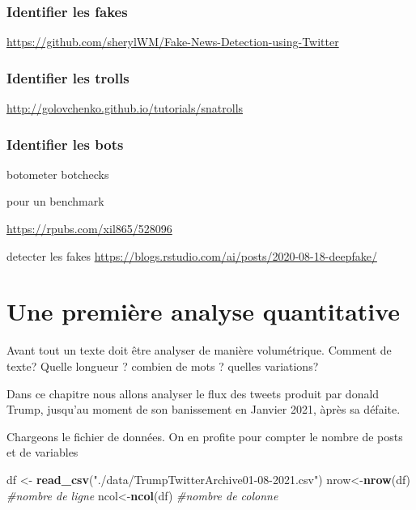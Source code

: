 \documentclass[
]{book}
\newenvironment{Shaded}{\begin{snugshade}}{\end{snugshade}}
\newcommand{\CommentTok}[1]{\textcolor[rgb]{0.56,0.35,0.01}{\textit{#1}}}
\newcommand{\KeywordTok}[1]{\textcolor[rgb]{0.13,0.29,0.53}{\textbf{#1}}}
\newcommand{\NormalTok}[1]{#1}
\newcommand{\StringTok}[1]{\textcolor[rgb]{0.31,0.60,0.02}{#1}}
\begin{document}
\hypertarget{identifier-les-fakes}{%
\subsection{Identifier les fakes}\label{identifier-les-fakes}}

\url{https://github.com/sherylWM/Fake-News-Detection-using-Twitter}

\hypertarget{identifier-les-trolls}{%
\subsection{Identifier les trolls}\label{identifier-les-trolls}}

\url{http://golovchenko.github.io/tutorials/snatrolls}

\hypertarget{identifier-les-bots}{%
\subsection{Identifier les bots}\label{identifier-les-bots}}

botometer
botchecks

pour un benchmark

\url{https://rpubs.com/xil865/528096}

detecter les fakes \url{https://blogs.rstudio.com/ai/posts/2020-08-18-deepfake/}

\hypertarget{une-premiuxe8re-analyse-quantitative}{%
\chapter{Une première analyse quantitative}\label{une-premiuxe8re-analyse-quantitative}}

Avant tout un texte doit être analyser de manière volumétrique. Comment de texte? Quelle longueur ? combien de mots ? quelles variations?

Dans ce chapitre nous allons analyser le flux des tweets produit par donald Trump, jusqu'au moment de son banissement en Janvier 2021, àprès sa défaite.

Chargeons le fichier de données. On en profite pour compter le nombre de posts et de variables

\begin{Shaded}
\begin{Highlighting}[]
\NormalTok{df <-}\StringTok{ }\KeywordTok{read_csv}\NormalTok{(}\StringTok{"./data/TrumpTwitterArchive01-08-2021.csv"}\NormalTok{)}
\NormalTok{nrow<-}\KeywordTok{nrow}\NormalTok{(df) }\CommentTok{#nombre de ligne}
\NormalTok{ncol<-}\KeywordTok{ncol}\NormalTok{(df) }\CommentTok{#nombre de colonne}
\end{Highlighting}
\end{Shaded}
\end{document}
